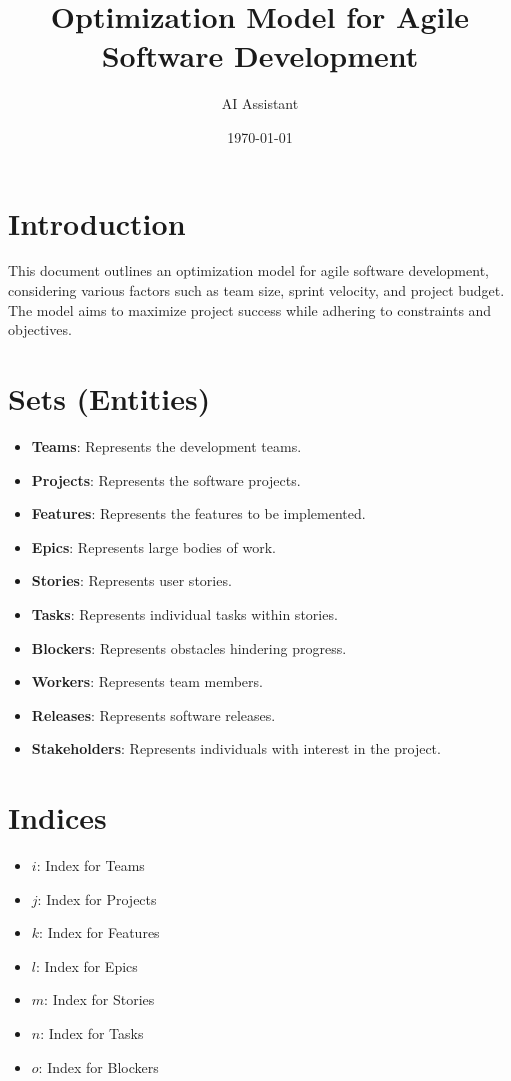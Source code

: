 \documentclass{article}
\title{Optimization Model for Agile Software Development}
\author{AI Assistant}
\date{\today}
\begin{document}
\maketitle

\tableofcontents

\section{Introduction}
This document outlines an optimization model for agile software development, considering various factors such as team size, sprint velocity, and project budget. The model aims to maximize project success while adhering to constraints and objectives.

\section{Sets (Entities)}
\begin{itemize}
    \item \textbf{Teams}: Represents the development teams.
    \item \textbf{Projects}: Represents the software projects.
    \item \textbf{Features}: Represents the features to be implemented.
    \item \textbf{Epics}: Represents large bodies of work.
    \item \textbf{Stories}: Represents user stories.
    \item \textbf{Tasks}: Represents individual tasks within stories.
    \item \textbf{Blockers}: Represents obstacles hindering progress.
    \item \textbf{Workers}: Represents team members.
    \item \textbf{Releases}: Represents software releases.
    \item \textbf{Stakeholders}: Represents individuals with interest in the project.
\end{itemize}

\section{Indices}
\begin{itemize}
    \item $i$: Index for Teams
    \item $j$: Index for Projects
    \item $k$: Index for Features
    \item $l$: Index for Epics
    \item $m$: Index for Stories
    \item $n$: Index for Tasks
    \item $o$: Index for Blockers
\end{itemize}
\end{document}
